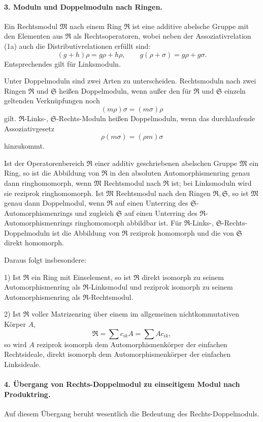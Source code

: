 \documentclass[11pt]{article}
\providecommand{\frR}{\mathfrak R}
\providecommand{\frS}{\mathfrak S}
\providecommand{\frM}{\mathfrak M}
\begin{document}
\paragraph{3. Moduln und Doppelmoduln nach Ringen.}
Ein Rechtsmodul \(\frM\) nach einem Ring \(\frR\) ist eine additive abelsche Gruppe mit den Elementen aus \(\frR\) als Rechtsoperatoren, wobei neben der Assoziativrelation (1a) auch die Distributivrelationen erfüllt sind:
\[
        (g+h)\rho=g\rho+h\rho,\qquad
        g(\rho+\sigma)=g\rho+g\sigma.                                  \tag{3a}
\]
Entsprechendes gilt für Linksmoduln.

Unter Doppelmoduln sind zwei Arten zu unterscheiden. Rechtsmoduln nach zwei Ringen \(\frR\) und \(\frS\) heißen Doppelmoduln, wenn außer den für \(\frR\) und \(\frS\) einzeln geltenden Verknüpfungen noch
\[
        (m\rho)\sigma=(m\sigma)\rho
\]
gilt. \(\frR\)-Links-, \(\frS\)-Rechts-Moduln heißen Doppelmoduln, wenn das durchlaufende Assoziativgesetz
\[
        \rho(m\sigma)=(\rho m)\sigma
\]
hinzukommt.

Ist der Operatorenbereich \(\frR\) einer additiv geschriebenen abelschen Gruppe \(\frM\) ein Ring, so ist die Abbildung von \(\frR\) in den absoluten Automorphismenring genau dann ringhomomorph, wenn \(\frM\) Rechtsmodul nach \(\frR\) ist; bei Linksmoduln wird sie reziprok ringhomomorph. Ist \(\frM\) Rechtsmodul nach den Ringen \(\frR,\frS\), so ist \(\frM\) genau dann Doppelmodul, wenn \(\frR\) auf einen Unterring des \(\frS\)-Automorphismenrings und zugleich \(\frS\) auf einen Unterring des \(\frR\)-Automorphismenrings ringhomomorph abbildbar ist. Für \(\frR\)-Links-, \(\frS\)-Rechts-Doppelmoduln ist die Abbildung von \(\frR\) reziprok homomorph und die von \(\frS\) direkt homomorph.

Daraus folgt insbesondere:

1) Ist \(\frR\) ein Ring mit Einselement, so ist \(\frR\) direkt isomorph zu seinem Automorphismenring als \(\frR\)-Linksmodul und reziprok isomorph zu seinem Automorphismenring als \(\frR\)-Rechtsmodul.

2) Ist \(\frR\) voller Matrizenring über einem im allgemeinen nichtkommutativen Körper \(A\),
\[
        \frR=\sum c_{ik}A=\sum A c_{ik},
\]
so wird \(A\) reziprok isomorph dem Automorphismenkörper der einfachen Rechtsideale, direkt isomorph dem Automorphismenkörper der einfachen Linksideale.

\paragraph{4. Übergang von Rechts-Doppelmodul zu einseitigem Modul nach Produktring.}
Auf diesem Übergang beruht wesentlich die Bedeutung des Rechts-Doppelmoduls.
\end{document}
